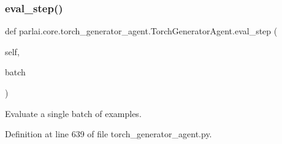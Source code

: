 \subsubsection{\texorpdfstring{eval\+\_\+step()}{eval\_step()}}
{\footnotesize\ttfamily def parlai.\+core.\+torch\+\_\+generator\+\_\+agent.\+Torch\+Generator\+Agent.\+eval\+\_\+step (\begin{DoxyParamCaption}\item[{}]{self,  }\item[{}]{batch }\end{DoxyParamCaption})}

\begin{DoxyVerb}Evaluate a single batch of examples.
\end{DoxyVerb}
 

Definition at line 639 of file torch\+\_\+generator\+\_\+agent.\+py.


